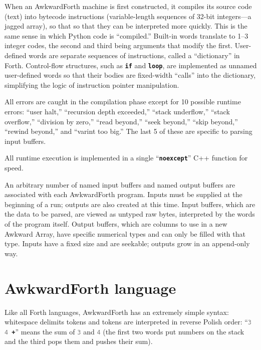 \documentclass{webofc}
\begin{document}
When an AwkwardForth machine is first constructed, it compiles its source code (text) into bytecode instructions (variable-length sequences of 32-bit integers---a jagged array), so that so that they can be interpreted more quickly. This is the same sense in which Python code is ``compiled.'' Built-in words translate to 1--3 integer codes, the second and third being arguments that modify the first. User-defined words are separate sequences of instructions, called a ``dictionary'' in Forth. Control-flow structures, such as \textcolor{OliveGreen}{\tt\textbf{if}} and \textcolor{OliveGreen}{\tt\textbf{loop}}, are implemented as unnamed user-defined words so that their bodies are fixed-width ``calls'' into the dictionary, simplifying the logic of instruction pointer manipulation.

All errors are caught in the compilation phase except for 10 possible runtime errors: ``user halt,'' ``recursion depth exceeded,'' ``stack underflow,'' ``stack overflow,'' ``division by zero,'' ``read beyond,'' ``seek beyond,'' ``skip beyond,'' ``rewind beyond,'' and ``varint too big.'' The last 5 of these are specific to parsing input buffers.

All runtime execution is implemented in a single ``\textcolor{OliveGreen}{\tt\textbf{noexcept}}'' C++ function for speed.

An arbitrary number of named input buffers and named output buffers are associated with each AwkwardForth program. Inputs must be supplied at the beginning of a run; outputs are also created at this time. Input buffers, which are the data to be parsed, are viewed as untyped raw bytes, interpreted by the words of the program itself. Output buffers, which are columns to use in a new Awkward Array, have specific numerical types and can only be filled with that type. Inputs have a fixed size and are seekable; outputs grow in an append-only way.

\section{AwkwardForth language}

Like all Forth languages, AwkwardForth has an extremely simple syntax: whitespace delimits tokens and tokens are interpreted in reverse Polish order: ``{\tt\textcolor{gray}{3} \textcolor{gray}{4} \textcolor{OliveGreen}{\textbf{+}}}'' means the sum of \textcolor{gray}{\tt 3} and \textcolor{gray}{\tt 4} (the first two words put numbers on the stack and the third pops them and pushes their sum).
\end{document}

